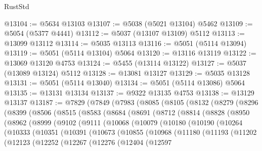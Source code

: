 \begin{lexlean}{RustStd}
\begin{coremodule}
@13104 := @5634 @13103
@13107 := @5038 (@5021 @13104) @5462
@13109 := @5054 (@5377 @4441)
@13112 := @5037 (@13107 @13109) @5112
@13113 := @13099 @13112
@13114 := @5035 @13113
@13116 := @5051 (@5114 @13094)
@13119 := @5051 (@5114 @13104) @5064
@13120 := @13116 @13119
@13122 := @13069 @13120 @4753
@13124 := @5455 (@13114 @13122)
@13127 := @5037 (@13089 @13124) @5112
@13128 := @13081 @13127
@13129 := @5035 @13128
@13131 := @5051 (@5114 @13040)
@13134 := @5051 (@5114 @13086) @5064
@13135 := @13131 @13134
@13137 := @9322 @13135 @4753
@13138 := @13129 @13137
@13187 := @7829
    (@7849
      (@7983
        (@8085
          (@8105
            (@8132
              (@8279
                (@8296
                  (@8399
                    (@8506
                      (@8515
                        (@8583
                          (@8684
                            (@8691
                              (@8712
                                (@8814
                                  (@8828
                                    (@8950
                                      (@8962
                                        (@8999
                                          (@9102
                                            (@9111
                                              (@10068
                                                (@10079
                                                  (@10180
                                                    (@10190
                                                      (@10264
                                                        (@10333
                                                          (@10351
                                                            (@10391
                                                              (@10673
                                                                (@10855
                                                                  (@10968
                                                                    (@11180
                                                                      (@11193
                                                                        (@11202
                                                                          (@12123
                                                                            (@12252
                                                                              (@12267
                                                                                (@12276
                                                                                  (@12404
                                                                                    (@12597

\end{coremodule}
\end{lexlean}
